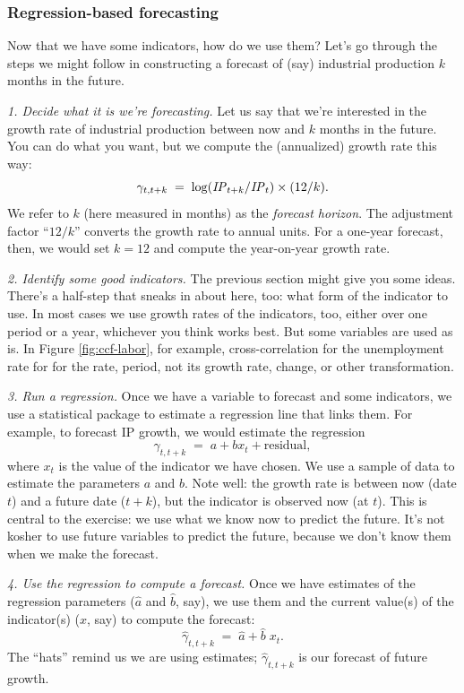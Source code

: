 \documentclass[letterpaper,12pt]{article}
\newcommand{\IP}{\mbox{\em IP\/}}
\begin{document}
\subsubsection*{Regression-based forecasting}

Now that we have some indicators, how do we use them?  
Let's go through the steps we might follow in constructing a forecast 
of (say) industrial production $k$ months in the future.  


{\it 1. Decide what it is we're forecasting.\/} 
Let us say that we're interested in the growth rate of industrial 
production between now and $k$ months in the future.
You can do what you want, but we compute the (annualized) growth
rate this way:
\[
    \gamma_{t,t+k} \;=\; \log (\IP_{t+k}/\IP_t) \times (12/k) .
\]
We refer to $k$ (here measured in months) as the {\it forecast
horizon\/}.  The adjustment factor ``$12/k$'' converts the growth
rate to annual units.
For a one-year forecast, then, we would set $k=12$ and compute the 
year-on-year growth rate.  

{\it 2. Identify some good indicators.\/} 
The previous section might give you some ideas.
There's a half-step that sneaks in about here, too:
what form of the indicator to use.  
In most cases we use growth rates of the indicators, too, 
either over one period or a year, whichever you think works best.
But some variables are used as is.
In Figure \ref{fig:ccf-labor}, for example, 
cross-correlation for the unemployment rate for for the rate, period, 
not its growth rate, change, or other transformation.  

{\it 3. Run a regression.\/} 
Once we have a variable to forecast and some indicators, 
we use a statistical package to estimate a regression line
that links them.  
For example, to forecast IP growth, we would estimate the regression
\[
        \gamma_{t,t+k}  \;=\;  a + b x_t + \mbox{residual},
\]
where $x_t$ is the value of the indicator we have chosen.  
We use a sample of data to estimate the parameters $a$ and $b$.  
Note well:  the growth rate is between now (date $t$) 
and a future date ($t+k$), 
but the indicator is observed now (at $t$).  
This is central to the exercise:  we use what we know now 
to predict the future.
It's not kosher to use future variables to predict the future, 
because we don't know them when we make the forecast.  


{\it 4. Use the regression to compute a forecast.\/} 
Once we have estimates of the regression 
parameters ($\widehat{a}$ and $\widehat{b}$, say), 
we use them and the current value(s)  
of the indicator(s) ($x$, say) 
to compute the forecast: 
\[
        \widehat{\gamma}_{t,t+k}  \;=\;  \widehat{a} + \widehat{b} \; x_t .
\]
The ``hats'' remind us we are using estimates;
$\widehat{\gamma}_{t,t+k}$ is our forecast of future growth.  
\end{document}
